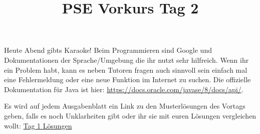 \documentclass{../../sheet}
\title{PSE Vorkurs Tag 2}
\begin{document}
\maketitle
Heute Abend gibts Karaoke!
Beim Programmieren sind Google und Dokumentationen der Sprache/Umgebung die ihr nutzt sehr hilfreich. Wenn ihr ein Problem habt, kann es neben Tutoren fragen auch sinnvoll sein einfach mal eine Fehlermeldung oder eine neue Funktion im Internet zu suchen. Die offizielle Dokumentation für Java ist hier: \url{https://docs.oracle.com/javase/8/docs/api/}.

Es wird auf jedem Ausgabenblatt ein Link zu den Musterlösungen des Vortags geben, falls es noch Unklarheiten gibt oder ihr sie mit euren Lösungen vergleichen wollt: \href{https://fius.de/wp-content/uploads/2025/10/Day1Musterloesung.zip}{Tag 1 Lösungen}
\end{document}
